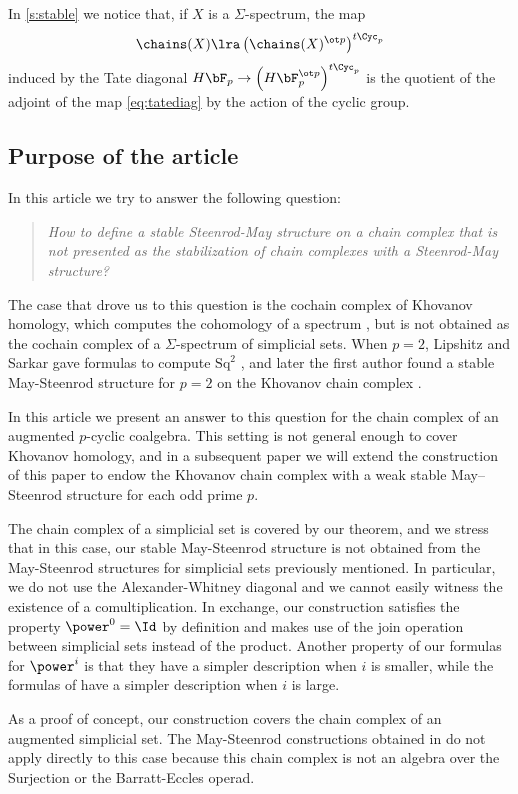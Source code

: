In \cref{s:stable} we notice that, if $X$ is a $\Sigma$-spectrum, the map
\[
	\chains(X)\lra \left(\chains(X)^{\ot p}\right)^{t\Cyc_p}
\] 
induced by the Tate diagonal $H\bF_p\to \left(H\bF_p^{\ot p}\right)^{t\Cyc_p}$ is the quotient of the adjoint of the map \eqref{eq:tatediag} by the action of the cyclic group.

 
 \subsection*{Purpose of the article} In this article we try to answer the following question: 
 \begin{quotation}
 	\emph{How to define a stable Steenrod-May structure on a chain complex that is not presented as the stabilization of chain complexes with a Steenrod-May structure?} 
 \end{quotation}
 The case that drove us to this question is the cochain complex of Khovanov homology, which computes the cohomology of a spectrum \cite{LS14, LLS20}, but is not obtained as the cochain complex of a $\Sigma$-spectrum of simplicial sets. When $p=2$, Lipshitz and Sarkar gave formulas to compute $\mathrm{Sq}^2$ \cite{LS14b}, and later the first author found a stable May-Steenrod structure for $p=2$ on the Khovanov chain complex \cite{cantero-moran2020khovanov}. 
 
  In this article we present an answer to this question for the chain complex of an augmented $p$-cyclic coalgebra. This setting is not general enough to cover Khovanov homology, and in a subsequent paper we will extend the construction of this paper to endow the Khovanov chain complex with a weak stable May--Steenrod structure for each odd prime $p$.
  
The chain complex of a simplicial set is covered by our theorem, and we stress that in this case, our stable May-Steenrod structure is not obtained from the May-Steenrod structures for simplicial sets previously mentioned. In particular, we do not use the Alexander-Whitney diagonal and we cannot easily witness the existence of a comultiplication. In exchange, our construction satisfies the property $\power^{0}=\Id$ by definition and makes use of the join operation between simplicial sets instead of the product. Another property of our formulas for $\power^i$ is that they have a simpler description when $i$ is smaller, while the formulas of \cite{medina2021may_st} have a simpler description when $i$ is large. 

As a proof of concept, our construction covers the chain complex of an augmented simplicial set. The May-Steenrod constructions obtained in \cite{mcclure2003multivariable, berger2004combinatorial, medina2021may_st} do not apply directly to this case because this chain complex is not an algebra over the Surjection or the Barratt-Eccles operad. 

